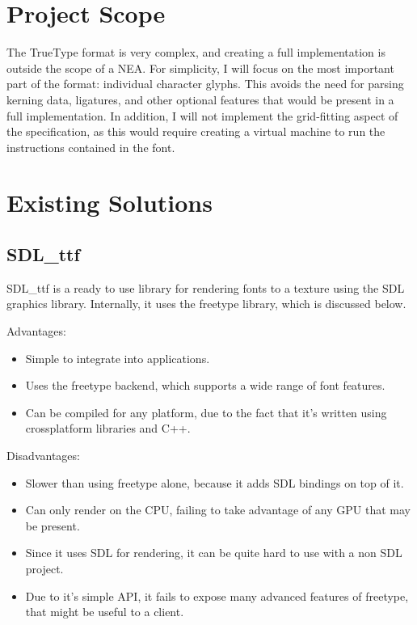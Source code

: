 \documentclass{report}
\begin{document}
\section{Project Scope}
The TrueType format is very complex, and creating a full implementation is
outside the scope of a NEA. For simplicity, I will focus on the most important
part of the format: individual character glyphs. This avoids the need for
parsing kerning data, ligatures, and other optional features that would be
present in a full implementation. In addition, I will not implement the
grid-fitting aspect of the specification, as this would require creating a
virtual machine to run the instructions contained in the font.



\section{Existing Solutions}
\subsection{SDL\_ttf}
SDL\_ttf is a ready to use library for rendering fonts to a texture using the
SDL graphics library. Internally, it uses the freetype library, which is
discussed below.

Advantages:
\begin{itemize}
\item{Simple to integrate into applications.}
\item{Uses the freetype backend, which supports a wide range of font features.}
\item{Can be compiled for any platform, due to the fact that it's written
    using crossplatform libraries and C++.}    
\end{itemize}

Disadvantages:
\begin{itemize}
\item{Slower than using freetype alone, because it adds SDL bindings on top of
    it.}
\item{Can only render on the CPU, failing to take advantage of any GPU that may
    be present.}
\item{Since it uses SDL for rendering, it can be quite hard to use with a non
    SDL project.}
\item{Due to it's simple API, it fails to expose many advanced features of
    freetype, that might be useful to a client.}
\end{itemize}
\end{document}

